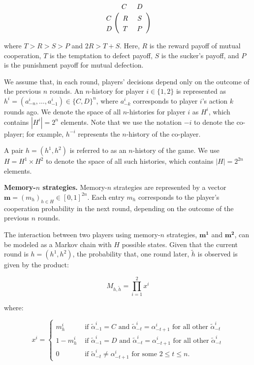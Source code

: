 \documentclass{article}
\theoremstyle{definition}
\begin{document}
\begin{align}\label{Eq:PrisonerDilemma}
  \bordermatrix{%
    & C & D \cr
    C &\ R &\ S\  \cr
    D &\ T &\ P\ \cr
  }
\end{align}

where $T > R > S > P$ and $2 R > T + S$. Here, $R$ is the reward payoff of mutual
cooperation, $T$ is the temptation to defect payoff, $S$ is the sucker's payoff,
and $P$ is the punishment payoff for mutual defection.

We assume that, in each round, players' decisions depend only on the outcome of
the previous \(n\) rounds. An \(n\)-history for player \(i \in \{1, 2\}\) is
represented as \(h^i = (a^i_{-n}, \ldots, a^i_{-1}) \in \{C, D\}^n\), where
\(a^i_{-k}\) corresponds to player \(i\)'s action \(k\) rounds ago. We denote
the space of all \(n\)-histories for player \(i\) as \(H^i\), which contains
\(|H^i| = 2^n\) elements. Note that we use the notation \(-i\) to denote the
co-player; for example, \(h^{-i}\) represents the \(n\)-history of the
co-player.

A pair \(h = (h^1, h^2)\) is referred to as an \(n\)-history of the game. We use
\(H = H^1 \times H^2\) to denote the space of all such histories, which contains
\(|H| = 2^{2n}\) elements.


{\bf Memory-\(n\) strategies.} Memory-\(n\) strategies are represented by a
vector \(\mathbf{m} = (m_h)_{h\in H} \in [0,1]^{2n}\). Each entry \(m_h\)
corresponds to the player's cooperation probability in the next round, depending
on the outcome of the previous \(n\) rounds.

The interaction between two players using memory-\(n\) strategies,
\(\mathbf{m^{1}}\) and \(\mathbf{m^{2}}\), can be modeled as a Markov chain with
\(H\) possible states. Given that the current round is \(h = (h^{1}, h^{2})\),
the probability that, one round later, \(\tilde{h}\) is observed is given by the
product:

\begin{equation}\label{Eq:TransitionMatrix}
M_{h, \tilde{h}} = \prod_{i=1}^{2} x^{i}
\end{equation}

where:

\[
x^i = 
\begin{cases}
  m^{i}_{h} & \text{ if } \tilde{\alpha}^i_{-1} = C \text{ and } \tilde{\alpha}^i_{-t} = \alpha^i_{-t + 1} \text{ for all other } \tilde{\alpha}^i_{-t}\\
  1 - m^{i}_{h} & \text{ if } \tilde{\alpha}^i_{-1} = D \text{ and } \tilde{\alpha}^i_{-t} = \alpha^i_{-t + 1} \text{ for all other } \tilde{\alpha}^i_{-t}\\
  0 & \text{ if } \tilde{\alpha}^i_{-t} \neq  \alpha^i_{-t + 1} \text{ for some } 2 \leq t \leq n.
\end{cases}
\]
\end{document}
